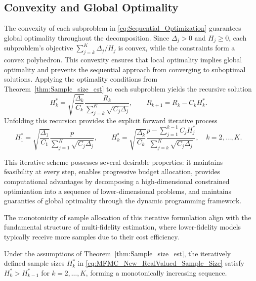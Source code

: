 \subsection{Convexity and Global Optimality}

The convexity of each subproblem in \eqref{eq:Sequential_Optimization} guarantees global optimality throughout the decomposition. Since $\Delta_j > 0$ and $H_j \ge 0$, each subproblem's objective $\sum_{j=k}^K \Delta_j/H_j$ is convex, while the constraints form a convex polyhedron. This convexity ensures that local optimality implies global optimality and prevents the sequential approach from converging to suboptimal solutions. Applying the optimality conditions from Theorem~\ref{thm:Sample_size_est} to each subproblem yields the recursive solution
%
\begin{equation*}
    H_k^* = \sqrt{\frac{\Delta_k}{C_k}} \frac{R_k}{\sum_{j=k}^K\sqrt{C_j\Delta_j}},
    \qquad 
    R_{k+1} = R_k - C_k H_k^*.
\end{equation*}
Unfolding this recursion provides the explicit forward iterative process
\begin{equation}\label{eq:MFMC_New_RealValued_Sample_Size}
    H_1^* = \sqrt{\frac{\Delta_1}{C_1}} \frac{p}{\sum_{j=1}^K\sqrt{C_j\Delta_j}}, 
    \qquad 
    H_k^* = \sqrt{\frac{\Delta_k}{C_k}} \frac{p-\sum_{j=1}^{k-1}C_jH_j^*}{\sum_{j=k}^K\sqrt{C_j\Delta_j}}, 
    \quad k = 2,\ldots, K.
\end{equation}


This iterative scheme possesses several desirable properties: it maintains feasibility at every step, enables progressive budget allocation, provides computational advantages by decomposing a high-dimensional constrained optimization into a sequence of lower-dimensional problems, and maintains guaranties of global optimality through the dynamic programming framework.

The monotonicity of sample allocation of this iterative formulation align with the fundamental structure of multi-fidelity estimation, where lower-fidelity models typically receive more samples due to their cost efficiency.
%
\begin{theorem}\label{thm:Monotonicity_H_k}
Under the assumptions of Theorem~\ref{thm:Sample_size_est}, the iteratively defined sample sizes $H_k^*$ in \eqref{eq:MFMC_New_RealValued_Sample_Size} satisfy $H_k^* > H_{k-1}^*$ for $k=2,\ldots,K$, forming a monotonically increasing sequence.
\end{theorem}
%

